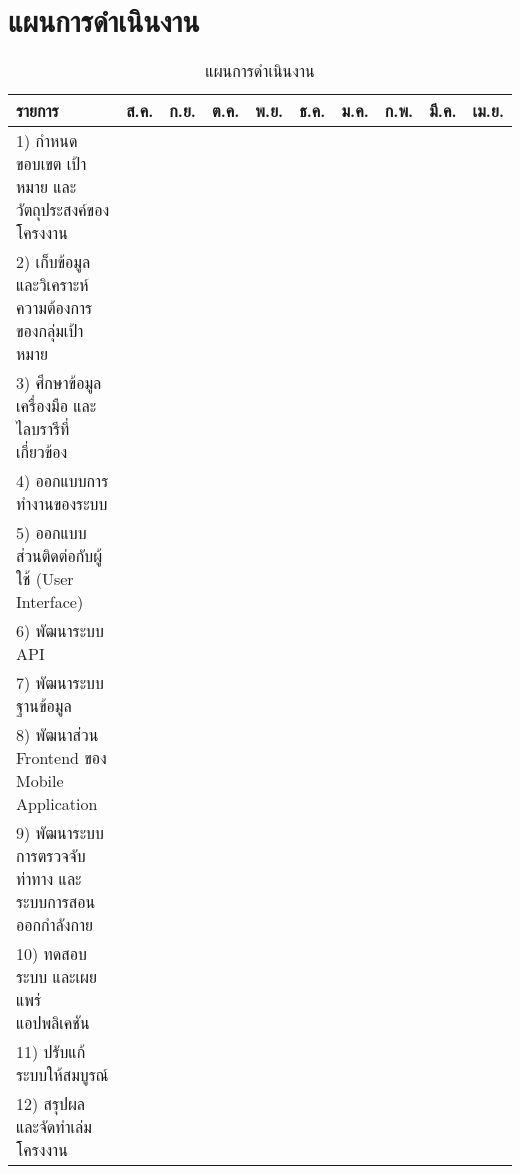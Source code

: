 \section{แผนการดำเนินงาน}
\noindent
\begin{table}
    \caption{แผนการดำเนินงาน}
    \begin{tabularx}{\textwidth}{ | >{\raggedright} X | c | c | c | c | c | c | c | c | c | }
        \hline
        \bf\centering รายการ & \bf ส.ค. & \bf ก.ย. & \bf ต.ค. & \bf พ.ย. & \bf ธ.ค. & \bf ม.ค. & \bf ก.พ. & \bf มี.ค. & \bf เม.ย.\\
        \hline
        1) กำหนดขอบเขต เป้าหมาย และวัตถุประสงค์ของโครงงาน & \cellcolor[gray]{.7} & \null & \null & \null & \null & \null & \null & \null & \null\\
        \hline
        2) เก็บข้อมูลและวิเคราะห์ความต้องการของกลุ่มเป้าหมาย & \cellcolor[gray]{.7} & \null & \null & \null & \null & \null & \null & \null & \null\\
        \hline
        3) ศึกษาข้อมูล เครื่องมือ และไลบรารีที่เกี่ยวข้อง & \cellcolor[gray]{.7} & \cellcolor[gray]{.7} & \null & \null & \null & \null & \null & \null & \null\\
        \hline
        4) ออกแบบการทำงานของระบบ & \null & \cellcolor[gray]{.7} & \null & \null & \null & \null & \null & \null & \null\\
        \hline
        5) ออกแบบส่วนติดต่อกับผู้ใช้ (User Interface) & \null & \cellcolor[gray]{.7} & \cellcolor[gray]{.7} & \null & \null & \null & \null & \null & \null\\
        \hline
        6) พัฒนาระบบ API & \null & \cellcolor[gray]{.7} & \cellcolor[gray]{.7} & \null & \null & \null & \null & \null & \null\\
        \hline
        7) พัฒนาระบบฐานข้อมูล & \null & \cellcolor[gray]{.7} & \cellcolor[gray]{.7} & \null & \null & \null & \null & \null & \null\\
        \hline
        8) พัฒนาส่วน Frontend ของ Mobile Application & \null & \cellcolor[gray]{.7} & \cellcolor[gray]{.7} & \cellcolor[gray]{.7} & \null & \null & \null & \null & \null\\
        \hline
        9) พัฒนาระบบการตรวจจับท่าทาง และระบบการสอนออกกำลังกาย & \null & \cellcolor[gray]{.7} & \cellcolor[gray]{.7} & \cellcolor[gray]{.7} & \null & \null & \null & \null & \null\\
        \hline
        10) ทดสอบระบบ และเผยแพร่แอปพลิเคชัน & \null & \null & \null & \null & \cellcolor[gray]{.7} & \null & \cellcolor[gray]{.7} & \null & \null\\
        \hline
        11) ปรับแก้ระบบให้สมบูรณ์ & \null & \null & \null & \null & \null & \cellcolor[gray]{.7} & \cellcolor[gray]{.7} & \cellcolor[gray]{.7} & \null\\
        \hline
        12) สรุปผล และจัดทำเล่มโครงงาน & \null & \null & \null & \null & \null & \null & \null & \cellcolor[gray]{.7} & \cellcolor[gray]{.7}\\
        \hline
    \end{tabularx}
\end{table}

